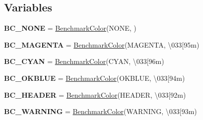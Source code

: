 \subsection*{Variables}
\begin{DoxyCompactItemize}
\item 
\mbox{\label{namespacegbench_1_1report_a4bd67facb35a4e21c5d8344474b54bf9}} 
{\bfseries B\+C\+\_\+\+N\+O\+NE} = \mbox{\hyperlink{classgbench_1_1report_1_1_benchmark_color}{Benchmark\+Color}}(\textquotesingle{}N\+O\+NE\textquotesingle{}, \textquotesingle{}\textquotesingle{})
\item 
\mbox{\label{namespacegbench_1_1report_ad8e89e02bcd8466734741dc7f93f57a1}} 
{\bfseries B\+C\+\_\+\+M\+A\+G\+E\+N\+TA} = \mbox{\hyperlink{classgbench_1_1report_1_1_benchmark_color}{Benchmark\+Color}}(\textquotesingle{}M\+A\+G\+E\+N\+TA\textquotesingle{}, \textquotesingle{}\textbackslash{}033\mbox{[}95m\textquotesingle{})
\item 
\mbox{\label{namespacegbench_1_1report_aae109129b59010ee02cbafd4a81a006b}} 
{\bfseries B\+C\+\_\+\+C\+Y\+AN} = \mbox{\hyperlink{classgbench_1_1report_1_1_benchmark_color}{Benchmark\+Color}}(\textquotesingle{}C\+Y\+AN\textquotesingle{}, \textquotesingle{}\textbackslash{}033\mbox{[}96m\textquotesingle{})
\item 
\mbox{\label{namespacegbench_1_1report_a0ae8f210544c77fa9bff535da3311276}} 
{\bfseries B\+C\+\_\+\+O\+K\+B\+L\+UE} = \mbox{\hyperlink{classgbench_1_1report_1_1_benchmark_color}{Benchmark\+Color}}(\textquotesingle{}O\+K\+B\+L\+UE\textquotesingle{}, \textquotesingle{}\textbackslash{}033\mbox{[}94m\textquotesingle{})
\item 
\mbox{\label{namespacegbench_1_1report_a726a05e958574118db355abcd7c945fc}} 
{\bfseries B\+C\+\_\+\+H\+E\+A\+D\+ER} = \mbox{\hyperlink{classgbench_1_1report_1_1_benchmark_color}{Benchmark\+Color}}(\textquotesingle{}H\+E\+A\+D\+ER\textquotesingle{}, \textquotesingle{}\textbackslash{}033\mbox{[}92m\textquotesingle{})
\item 
\mbox{\label{namespacegbench_1_1report_abbd4e7995b504671c4c0977cf6847c53}} 
{\bfseries B\+C\+\_\+\+W\+A\+R\+N\+I\+NG} = \mbox{\hyperlink{classgbench_1_1report_1_1_benchmark_color}{Benchmark\+Color}}(\textquotesingle{}W\+A\+R\+N\+I\+NG\textquotesingle{}, \textquotesingle{}\textbackslash{}033\mbox{[}93m\textquotesingle{})

\end{DoxyCompactItemize}
